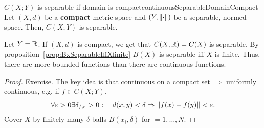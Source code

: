 \documentclass[language=english]{../../Template/TemplateLecture}
\begin{document}
\begin{thm}{$C(X;Y)$ is separable if domain is compact}{continuousSeparableDomainCompact}
    Let $(X,d)$ be a \textbf{compact} metric space and $(Y, \lVert\cdot\rVert)$ be a separable, normed space. Then, $C(X; Y)$ is separable.
\end{thm}
\begin{beispiel}
    Let $Y = \mathbb{R}$.
    If $(X,d)$ is compact, we get that $C(X, \mathbb{R}) = C(X)$ is separable. By proposition~\ref{prop:BxSeparableIffXfinite} $B(X)$ is separable iff $X$ is finite. Thus, there are more bounded functions than there are continuous functions.
\end{beispiel}
\begin{proof}
    Exercise. The key idea is that continuous on a compact set $\Rightarrow$ uniformly continuous, e.g. if $f \in C(X;Y)$,
    \begin{equation}
        \forall \varepsilon > 0 \exists \delta_{f,\varepsilon} > 0: \quad d(x,y) < \delta \Rightarrow \lVert f(x) - f(y)\rVert < \varepsilon.
    \end{equation}
    Cover $X$ by finitely many $\delta$-balls $B(x_i,\delta)$ for $ = 1,\ldots,N$.
\end{proof}
\end{document}

